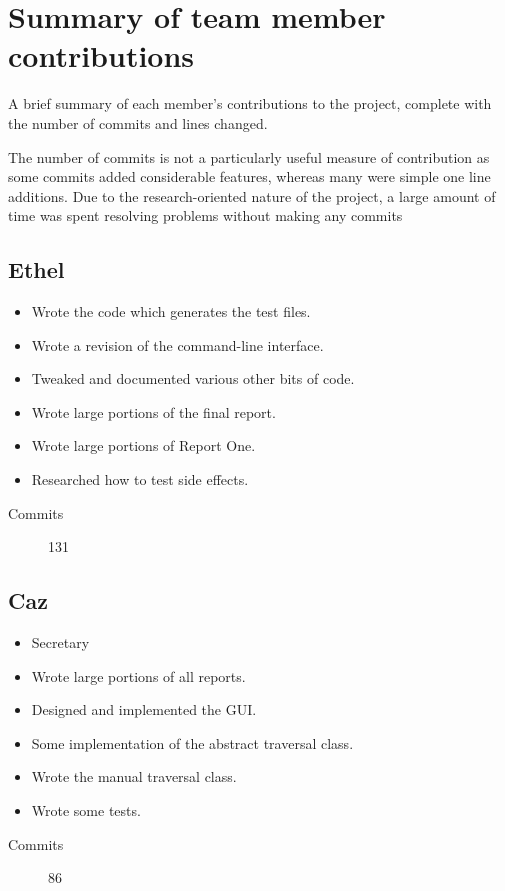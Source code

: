 \section{Summary of team member contributions}
  A brief summary of each member's contributions to the project, complete with the number of commits and lines changed.

  The number of commits is not a particularly useful measure of contribution as some commits added considerable features, whereas many were simple one line additions. 
  Due to the research-oriented nature of the project, a large amount of time was spent resolving problems without making any commits

  \subsection{Ethel}
    \begin{itemize}
      \item Wrote the code which generates the test files.
      \item Wrote a revision of the command-line interface.
      \item Tweaked and documented various other bits of code.
      \item Wrote large portions of the final report.
      \item Wrote large portions of Report One.
      \item Researched how to test side effects.
    \end{itemize}
   
    \begin{description}
      \item[Commits] 131
    \end{description}

  \subsection{Caz}
    \begin{itemize}
    \item Secretary
    \item Wrote large portions of all reports.
    \item Designed and implemented the GUI.
    \item Some implementation of the abstract traversal class.
    \item Wrote the manual traversal class.
    \item Wrote some tests.
    \end{itemize}
    \begin{description}
      \item[Commits] 86
    \end{description}

